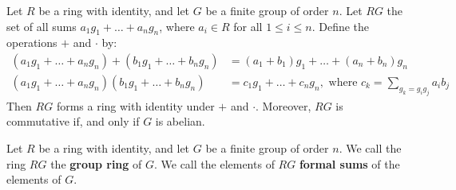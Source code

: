 \begin{theorem}\label{theorem_5.2.4}
    Let $R$ be a ring with identity, and let $G$ be a finite group of order $n$.
    Let $RG$ the set of all sums $a_1g_1+\dots+a_ng_n$, where $a_i \in R$ for
    all  $1 \leq i \leq n$. Define the operations $+$ and $\cdot$ by:
    \begin{align*}
        (a_1g_1+\dots+a_ng_n)+(b_1g_1+\dots+b_ng_n) &= (a_1+b_1)g_1+\dots+(a_n+b_n)g_n \\
        (a_1g_1+\dots+a_ng_n)(b_1g_1+\dots+b_ng_n)  &=  c_1g_1+\dots+c_ng_n,
        \text{ where } c_k=\sum_{g_k=g_ig_j}{a_ib_j}
    \end{align*}
    Then $RG$ forms a ring with identity under  $+$ and  $\cdot$. Moreover, $RG$
    is commutative if, and only if $G$ is abelian.
\end{theorem}

\begin{definition}
    Let $R$ be a ring with identity, and let  $G$ be a finite group of order
    $n$. We call the ring $RG$ the \textbf{group ring} of $G$. We call the
    elements of  $RG$  \textbf{formal sums} of the elements of $G$.
\end{definition}

